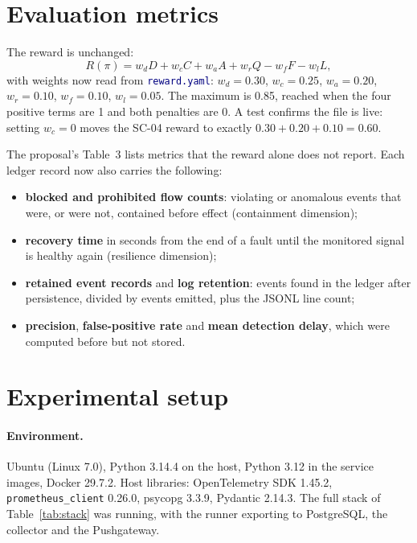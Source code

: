 \documentclass[11pt]{article}
\newcommand{\code}[1]{\texttt{\small #1}}
\newcommand{\file}[1]{\textcolor{navy}{\texttt{\small #1}}}
\begin{document}
\section{Evaluation metrics}
\label{sec:metrics}
The reward is unchanged:
\begin{equation}
R(\pi) = w_dD + w_cC + w_aA + w_rQ - w_fF - w_lL,
\end{equation}
with weights now read from \file{reward.yaml}: $w_d=0.30$, $w_c=0.25$,
$w_a=0.20$, $w_r=0.10$, $w_f=0.10$, $w_l=0.05$. The maximum is 0.85, reached when
the four positive terms are 1 and both penalties are 0. A test confirms the file
is live: setting $w_c=0$ moves the SC-04 reward to exactly $0.30+0.20+0.10=0.60$.

The proposal's Table~3 lists metrics that the reward alone does not report. Each
ledger record now also carries the following:
\begin{itemize}[leftmargin=1.4em,itemsep=1pt]
\item \textbf{blocked and prohibited flow counts}: violating or anomalous events
that were, or were not, contained before effect (containment dimension);
\item \textbf{recovery time} in seconds from the end of a fault until the monitored
signal is healthy again (resilience dimension);
\item \textbf{retained event records} and \textbf{log retention}: events found in the
ledger after persistence, divided by events emitted, plus the JSONL line count;
\item \textbf{precision}, \textbf{false-positive rate} and \textbf{mean detection delay},
which were computed before but not stored.
\end{itemize}

\section{Experimental setup}
\label{sec:setup}
\paragraph{Environment.} Ubuntu (Linux 7.0), Python 3.14.4 on the host, Python 3.12
in the service images, Docker 29.7.2. Host libraries: OpenTelemetry SDK 1.45.2,
\code{prometheus\_client} 0.26.0, psycopg 3.3.9, Pydantic 2.14.3. The full stack
of Table~\ref{tab:stack} was running, with the runner exporting to PostgreSQL,
the collector and the Pushgateway.
\end{document}
